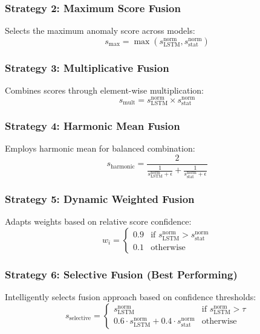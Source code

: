 \documentclass[conference]{IEEEtran}
\begin{document}
\subsubsection{Strategy 2: Maximum Score Fusion}
Selects the maximum anomaly score across models:
\begin{equation}
s_{\text{max}} = \max(s_{\text{LSTM}}^{\text{norm}}, s_{\text{stat}}^{\text{norm}})
\end{equation}

\subsubsection{Strategy 3: Multiplicative Fusion}
Combines scores through element-wise multiplication:
\begin{equation}
s_{\text{mult}} = s_{\text{LSTM}}^{\text{norm}} \times s_{\text{stat}}^{\text{norm}}
\end{equation}

\subsubsection{Strategy 4: Harmonic Mean Fusion}
Employs harmonic mean for balanced combination:
\begin{equation}
s_{\text{harmonic}} = \frac{2}{\frac{1}{s_{\text{LSTM}}^{\text{norm}} + \epsilon} + \frac{1}{s_{\text{stat}}^{\text{norm}} + \epsilon}}
\end{equation}

\subsubsection{Strategy 5: Dynamic Weighted Fusion}
Adapts weights based on relative score confidence:
\begin{equation}
w_i = \begin{cases} 
0.9 & \text{if } s_{\text{LSTM}}^{\text{norm}} > s_{\text{stat}}^{\text{norm}} \\
0.1 & \text{otherwise}
\end{cases}
\end{equation}

\subsubsection{Strategy 6: Selective Fusion (Best Performing)}
Intelligently selects fusion approach based on confidence thresholds:
\begin{equation}
s_{\text{selective}} = \begin{cases}
s_{\text{LSTM}}^{\text{norm}} & \text{if } s_{\text{LSTM}}^{\text{norm}} > \tau \\
0.6 \cdot s_{\text{LSTM}}^{\text{norm}} + 0.4 \cdot s_{\text{stat}}^{\text{norm}} & \text{otherwise}
\end{cases}
\end{equation}
\end{document}
